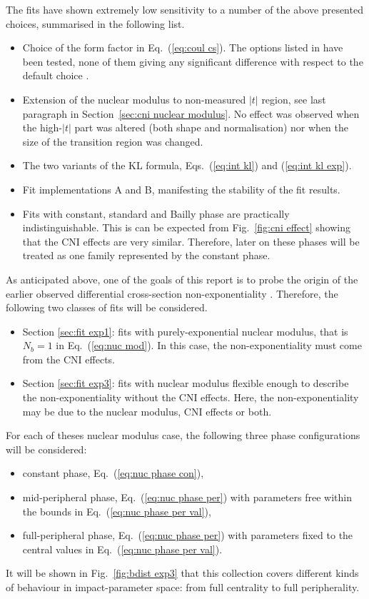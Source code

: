 The fits have shown extremely low sensitivity to a number of the above presented choices, summarised in the following list. 
\begin{itemize}
\item Choice of the form factor in Eq.~(\ref{eq:coul cs}). The options listed in \cite{elegent} have been tested, none of them giving any significant difference with respect to the default choice \cite{puckett10}.
\item Extension of the nuclear modulus to non-measured $|t|$ region, see last paragraph in Section~\ref{sec:cni nuclear modulus}. No effect was observed when the high-$|t|$ part was altered (both shape and normalisation) nor when the size of the transition region was changed.
\item The two variants of the KL formula, Eqs.~(\ref{eq:int kl}) and (\ref{eq:int kl exp}).
\item Fit implementations A and B, manifesting the stability of the fit results.
\item Fits with constant, standard and Bailly phase are practically indistinguishable. This is can be expected from Fig.~\ref{fig:cni effect} showing that the CNI effects are very similar. Therefore, later on these phases will be treated as one family represented by the constant phase.
\end{itemize}


As anticipated above, one of the goals of this report is to probe the origin of the earlier observed differential cross-section non-exponentiality \cite{8tev-90m}. Therefore, the following two classes of fits will be considered.
\begin{itemize}
\item Section \ref{sec:fit exp1}: fits with purely-exponential nuclear modulus, that is $N_b=1$ in Eq.~(\ref{eq:nuc mod}). In this case, the non-exponentiality must come from the CNI effects.
\item Section \ref{sec:fit exp3}: fits with nuclear modulus flexible enough to describe the non-exponentiality without the CNI effects. Here, the non-exponentiality may be due to the nuclear modulus, CNI effects or both.
\end{itemize}
For each of theses nuclear modulus case, the following three phase configurations will be considered:
\begin{itemize}\setlength\itemsep{0pt}
\item constant phase, Eq.~(\ref{eq:nuc phase con}),
\item mid-peripheral phase, Eq.~(\ref{eq:nuc phase per}) with parameters free within the bounds in Eq.~(\ref{eq:nuc phase per val}),
\item full-peripheral phase, Eq.~(\ref{eq:nuc phase per}) with parameters fixed to the central values in Eq.~(\ref{eq:nuc phase per val}).
\end{itemize}
It will be shown in Fig.~\ref{fig:bdist exp3} that this collection covers different kinds of behaviour in impact-parameter space: from full centrality to full peripherality.


